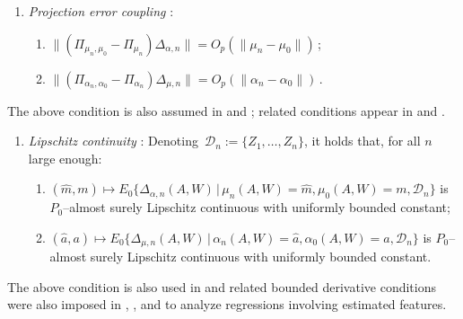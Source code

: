\documentclass[11pt]{article}
\theoremstyle{plain}
\begin{document}
  \begin{enumerate}[label=\bf{\ref{cond:ortho}$^{*}$}, ref={\ref{cond:ortho}$^{*}$}]
  \item \textit{Projection error coupling}  \citep{van2014targeted}: \label{cond:projectioncoupling1}  
      \begin{enumerate}[label={\roman*)}, ref={\ref{cond:projectioncoupling1}\roman*}]\vspace{-.05in}
     \item \label{cond:projectioncoupling1A}   $  \|(\Pi_{\mu_n, \mu_0} - \Pi_{\mu_n})\Delta_{\alpha,n}\|  =   O_p(\|\mu_n - \mu_0 \|)$\,; \vspace{-.05in}
     \item \label{cond:projectioncoupling1B}   $\|(\Pi_{\alpha_n, \alpha_0} - \Pi_{\alpha_n})\Delta_{\mu,n}\|  = O_p( \|\alpha_n - \alpha_0 \|)$\,.
 
    \end{enumerate}

\end{enumerate}
The above condition is also assumed in \citet[][Theorem~1]{benkeser2017doubly} and \citet[][Assumption~3]{dukes2024doubly}; related conditions appear in \cite{diaz2017doubly} and \cite{diaz2019statistical}.
  \begin{enumerate}[label=\bf{\ref{cond:ortho}$^{**}$}, ref={\ref{cond:ortho}$^{**}$}]
    \item\textit{Lipschitz continuity} 
\citep{bonvini2024doubly}: Denoting\ $\mathcal{D}_n := \{Z_1,\ldots,Z_n\}$, it holds that, for all $n$ large enough:\label{cond:projectioncoupling2}  
    \begin{enumerate}[
  label={\roman*)},
  ref=\ref{cond:projectioncoupling2}\roman*,
  leftmargin=-10pt,
  labelsep=-0.7em,
  labelindent=0pt,
  align=left
]\item $(\widehat{m}, m) \mapsto E_0\{\Delta_{\alpha,n}(A,W) \,|\,  \mu_n(A,W) = \widehat{m}, \mu_0(A,W) = m, \mathcal{D}_n\}$ is $P_0$--almost surely Lipschitz continuous with uniformly bounded constant;\label{cond:projectioncoupling2A}  
    \item  $(\widehat{a}, a) \mapsto E_0\{\Delta_{\mu,n}(A,W) \,|\,  \alpha_n(A,W) = \widehat{a}, \alpha_0(A,W) = a, \mathcal{D}_n\}$ is $P_0$--almost surely Lipschitz continuous with uniformly bounded constant.\label{cond:projectioncoupling2B}  
    \end{enumerate}
    
\end{enumerate}
The above condition is also used in \citet[][Section~3.1]{bonvini2024doubly} and related bounded derivative conditions were also imposed in \citet[][Condition~v in Appendix~F]{benkeser2020nonparametric}, \citet[][Lemma~1]{van2023adaptive}, and \citet[][Lemma~I.1]{wang2023super} to analyze regressions involving estimated features.
\end{document}
